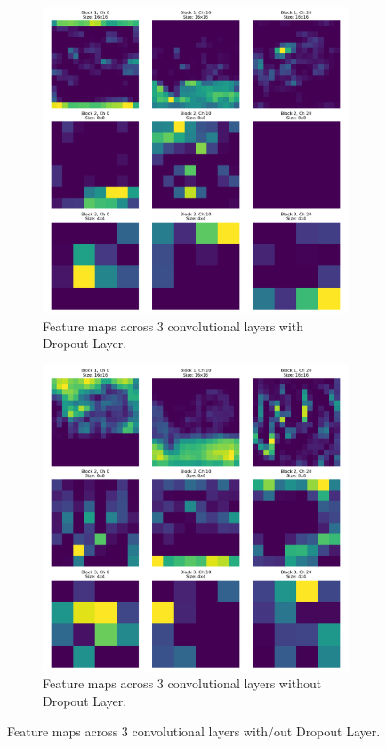 \begin{figure}[H]
    \centering
    \begin{subfigure}[t]{0.48\textwidth}
        \centering
        \includegraphics[width=\textwidth]{assignment_1/report/images/ex_3_feature_maps_visualization_dropout.png}
        \caption{Feature maps across 3 convolutional layers with Dropout Layer.}
    \end{subfigure}
    \hfill
    \begin{subfigure}[t]{0.48\textwidth}
        \centering
        \includegraphics[width=\textwidth]{assignment_1/report/images/ex_3_feature_maps_visualization.png}
        \caption{Feature maps across 3 convolutional layers without Dropout Layer.}
    \end{subfigure}
    \caption{Feature maps across 3 convolutional layers with/out Dropout Layer.}
\end{figure}

